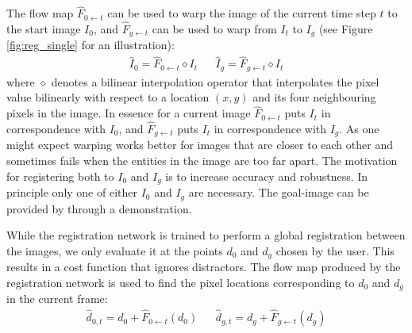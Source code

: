 The flow map $\hat{F}_{0 \leftarrow t}$ can be used to warp the image of the current time step $t$ to the start image $I_0$, and $\hat{F}_{g \leftarrow t}$ can be used to warp from $I_t$ to $I_g$ (see Figure \ref{fig:reg_single} for an illustration):
\begin{align}
    \hat{I}_0 = \hat{F}_{0 \leftarrow t} \diamond  I_t &&
    \hat{I}_g = \hat{F}_{g \leftarrow t} \diamond  I_t 
\end{align}
where $\diamond$ denotes a bilinear interpolation operator that interpolates the pixel value bilinearly with respect to a location $(x,y)$ and its four neighbouring pixels in the image. In essence for a current image $\hat{F}_{0 \leftarrow t}$ puts $I_t$ in correspondence with $I_0$, and $\hat{F}_{g \leftarrow t}$ puts $I_t$ in correspondence with $I_g$. As one might expect warping works better for images that are closer to each other and sometimes fails when the entities in the image are too far apart. The motivation for registering both to $I_0$ and $I_g$ is to increase accuracy and robustness. In principle only one of either $I_0$ and $I_g$ are necessary. The goal-image can be provided by through a demonstration.

While the registration network is trained to perform a global registration between the images, we only evaluate it at the points $d_0$ and $d_g$ chosen by the user. This results in a cost function that ignores distractors. The flow map produced by the registration network is used to find the pixel locations corresponding to $d_0$ and $d_g$ in the current frame: 
\begin{align}
    \hat{d}_{0,t} = d_0 + \hat{F}_{0 \leftarrow t}(d_0) &&
    \hat{d}_{g,t} = d_g + \hat{F}_{g \leftarrow t}(d_g)
    \label{eqn:warped_pos}
\end{align}


